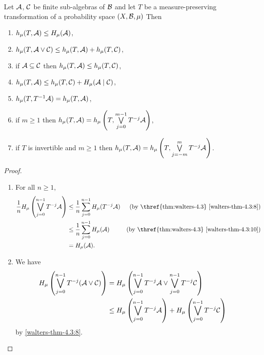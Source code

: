\begin{theorem} \label{thm:walters-4.12}
	Let $\mathcal{A}$, $\mathcal{C}$ be finite sub-algebras of $\mathcal{B}$ and let $T$ be a measure-preserving transformation of a probability space $(X, \mathcal{B}, \mu)$ Then
	\begin{enumerate}
		\item $h_\mu(T, \mathcal{A}) \leq H_\mu(\mathcal{A})$, \label{walters:thm-4-12:1}
		\item $h_\mu(T, \mathcal{A} \vee \mathcal{C}) \leq h_\mu(T, \mathcal{A}) + h_\mu(T, \mathcal{C})$, \label{walters:thm-4-12:2}
		\item if $\mathcal{A} \subseteq \mathcal{C}$ then $h_\mu(T, \mathcal{A}) \leq h_\mu(T, \mathcal{C})$, \label{walters:thm-4-12:3}
		\item $h_\mu(T, \mathcal{A}) \leq h_\mu(T, \mathcal{C}) + H_\mu(\mathcal{A} \mid \mathcal{C})$, \label{walters:thm-4-12:4}
		\item $h_\mu(T, T^{-1}{\mathcal{A}}) = h_\mu(T, \mathcal{A})$, \label{walters:thm-4-12:5}
		\item if $m \geq 1$ then $h_\mu(T, \mathcal{A}) = h_\mu\left(T, \bigvee\limits_{j = 0}^{m - 1}{T^{-j}{\mathcal{A}}}\right)$, \label{walters:thm-4-12:6}
		\item if $T$ is invertible and $m \geq 1$ then $h_\mu(T, \mathcal{A}) = h_\mu\left(T, \bigvee\limits_{j = -m}^m{T^{-j}{\mathcal{A}}}\right)$. \label{walters:thm-4-12:7}
	\end{enumerate}
	\begin{proof} \hfill
		\begin{enumerate}
			\item For all $n \geq 1$,
				\begin{align*}
					\frac{1}{n} H_\mu\left(\bigjoin_{j = 0}^{n - 1}{T^{-j}{\A}}\right) &\leq \frac{1}{n} \sum_{j = 0}^{n - 1}{H_\mu({T^{-j}{\A}})} & \text{(by \thref{thm:walters-4.3} \ref{walters-thm-4.3:8})} \\
						&\leq \frac{1}{n} \sum_{j = 0}^{n - 1}{H_\mu(\A)} & \text{(by \thref{thm:walters-4.3} \ref{walters-thm-4.3:10})} \\
						&= H_\mu(\A).
				\end{align*}
			\item We have
				\begin{align*}
					H_\mu\left(\bigvee_{j = 0}^{n - 1}{T^{-j}(\mathcal{A} \vee \mathcal{C})}\right) &= H_\mu\left(\bigvee_{j = 0}^{n - 1}{T^{-j}{\mathcal{A}}} \vee \bigvee_{j = 0}^{n - 1}{T^{-j}{\mathcal{C}}}\right) \\
						&\leq H_\mu\left(\bigvee_{j = 0}^{n - 1}{T^{-j}{\mathcal{A}}}\right) + H_\mu\left(\bigvee_{j = 0}^{n - 1}{T^{-j}{\mathcal{C}}}\right)
				\end{align*}
				by  \ref{walters-thm-4.3:8}.

\end{enumerate}
\end{proof}
\end{theorem}
